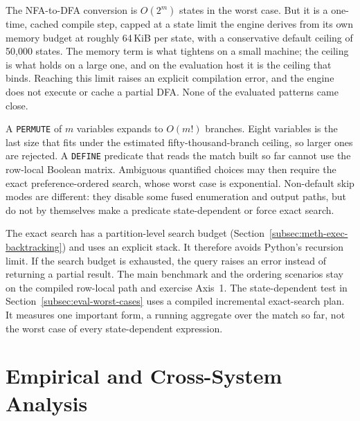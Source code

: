 The NFA-to-DFA conversion is $O(2^{m})$ states in the worst case.  But
it is a one-time, cached compile step, capped at a state limit the
engine derives from its own memory budget at roughly 64\,KiB per state,
with a conservative default ceiling of 50{,}000 states.  The memory term
is what tightens on a small machine; the ceiling is what holds on a
large one, and on the evaluation host it is the ceiling that binds.
Reaching this limit raises an explicit compilation error, and the engine
does not execute or cache a partial DFA.  None of the evaluated patterns
came close.

A \texttt{PERMUTE} of $m$ variables expands to $O(m!)$ branches.  Eight
variables is the last size that fits under the estimated
fifty-thousand-branch ceiling, so larger ones are rejected.
A \texttt{DEFINE} predicate that reads the match built so far cannot
use the row-local Boolean matrix.  Ambiguous quantified choices may
then require the exact preference-ordered search, whose worst case is
exponential.  Non-default skip modes are different: they disable some
fused enumeration and output paths, but do not by themselves make a
predicate state-dependent or force exact search.

The exact search has a partition-level search budget
(Section~\ref{subsec:meth-exec-backtracking}) and uses an explicit
stack.  It therefore avoids Python's recursion limit.  If the search
budget is exhausted, the query raises an error instead of returning a partial
result.  The main benchmark and the ordering scenarios stay on the
compiled row-local path and exercise Axis~1.  The state-dependent test
in Section~\ref{subsec:eval-worst-cases} uses a compiled incremental
exact-search plan.  It measures one important form, a running aggregate over the match so
far, not the worst case
of every state-dependent expression.

\section{Empirical and Cross-System Analysis}
\label{sec:eval-performance}
\label{subsec:eval-real-dataset}

